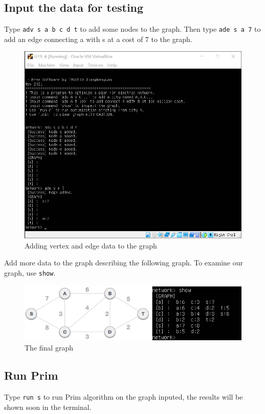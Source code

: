 \documentclass[cn,black,12pt,normal]{elegantnote}
\begin{document}
\subsection{Input the data for testing}

Type \lstinline{adv s a b c d t} to add some nodes to the graph. Then type \lstinline{ade s a 7} to add an edge connecting a with s at a cost of 7 to the graph.

\begin{figure}[H]
    \centering
    \includegraphics[width=0.7\linewidth]{image/grid_02.jpg}
    \caption{Adding vertex and edge data to the graph}
\end{figure}

Add more data to the graph describing the following graph. To examine our graph, use \lstinline{show}.

\begin{figure}[H]
    \centering
    \includegraphics[width=1.0\linewidth]{image/graph.png}
    \caption{The final graph}
\end{figure}


\subsection{Run Prim}

Type \lstinline{run s} to run Prim algorithm on the graph inputed, the results will be shown soon in the terminal. 
\end{document}
